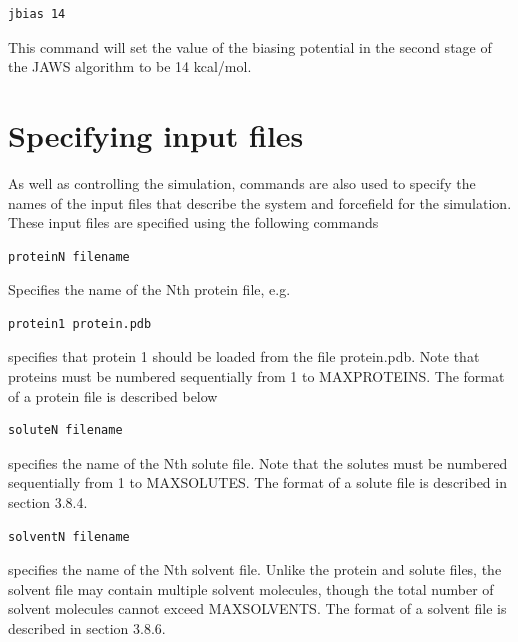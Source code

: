 \documentclass[letterpaper,10pt,english]{sphinxmanual}
\begin{document}
\begin{Verbatim}[commandchars=\\\{\}]
jbias 14
\end{Verbatim}

This command will set the value of the biasing potential in the second stage of the JAWS algorithm to be 14 kcal/mol.


\section{Specifying input files}
\label{protoms:specifying-input-files}
As well as controlling the simulation, commands are also used to specify the names of the input files that describe the system and forcefield for the simulation. These input files are specified using the following commands

\begin{Verbatim}[commandchars=\\\{\}]
proteinN filename
\end{Verbatim}

Specifies the name of the Nth protein file, e.g.

\begin{Verbatim}[commandchars=\\\{\}]
protein1 protein.pdb
\end{Verbatim}

specifies that protein 1 should be loaded from the file protein.pdb. Note that proteins must be numbered sequentially from 1 to MAXPROTEINS. The format of a protein file is described below

\begin{Verbatim}[commandchars=\\\{\}]
soluteN filename
\end{Verbatim}

specifies the name of the Nth solute file. Note that the solutes must be numbered sequentially from 1 to MAXSOLUTES. The format of a solute file is described in section 3.8.4.

\begin{Verbatim}[commandchars=\\\{\}]
solventN filename
\end{Verbatim}

specifies the name of the Nth solvent file. Unlike the protein and solute files, the solvent file may contain multiple solvent molecules, though the total number of solvent molecules cannot exceed MAXSOLVENTS. The format of a solvent file is described in section 3.8.6.
\end{document}
